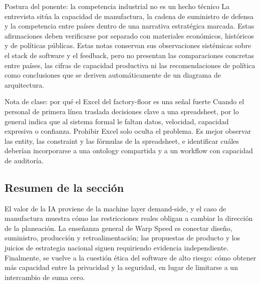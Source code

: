 \begin{warningbox}{Postura del ponente: la competencia industrial no es un hecho técnico}
La entrevista sitúa la capacidad de manufactura, la cadena de suministro de defensa y la competencia entre países dentro de una narrativa estratégica marcada. Estas afirmaciones deben verificarse por separado con materiales económicos, históricos y de políticas públicas. Estas notas conservan sus observaciones sistémicas sobre el stack de software y el feedback, pero no presentan las comparaciones concretas entre países, las cifras de capacidad productiva ni las recomendaciones de política como conclusiones que se deriven automáticamente de un diagrama de arquitectura.
\end{warningbox}

\begin{knowledgebox}{Nota de clase: por qué el Excel del factory-floor es una señal fuerte}
Cuando el personal de primera línea traslada decisiones clave a una spreadsheet, por lo general indica que al sistema formal le faltan datos, velocidad, capacidad expresiva o confianza. Prohibir Excel solo oculta el problema. Es mejor observar las entity, las constraint y las fórmulas de la spreadsheet, e identificar cuáles deberían incorporarse a una ontology compartida y a un workflow con capacidad de auditoría.
\end{knowledgebox}

\subsection{Resumen de la sección}

El valor de la IA proviene de la machine layer demand-side, y el caso de manufactura muestra cómo las restricciones reales obligan a cambiar la dirección de la planeación. La enseñanza general de Warp Speed es conectar diseño, suministro, producción y retroalimentación; las propuestas de producto y los juicios de estrategia nacional siguen requiriendo evidencia independiente. Finalmente, se vuelve a la cuestión ética del software de alto riesgo: cómo obtener más capacidad entre la privacidad y la seguridad, en lugar de limitarse a un intercambio de suma cero.
